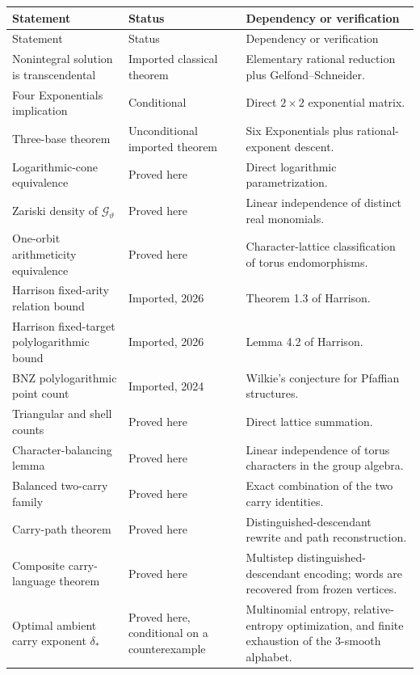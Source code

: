 \documentclass[11pt,oneside]{article}
\theoremstyle{definition}
\newcommand{\cG}{\mathscr{G}}
\begin{document}
\begin{longtable}{@{}>{\raggedright\arraybackslash}p{}>{\raggedright\arraybackslash}p{}>{\raggedright\arraybackslash}p{}@{}}
\toprule
Statement & Status & Dependency or verification \\
\midrule
\endfirsthead
\toprule
Statement & Status & Dependency or verification \\
\midrule
\endhead
Nonintegral solution is transcendental & Imported classical theorem & Elementary rational reduction plus Gelfond--Schneider. \\
Four Exponentials implication & Conditional & Direct $2\times2$ exponential matrix. \\
Three-base theorem & Unconditional imported theorem & Six Exponentials plus rational-exponent descent. \\
Logarithmic-cone equivalence & Proved here & Direct logarithmic parametrization. \\
Zariski density of $\cG_\vartheta$ & Proved here & Linear independence of distinct real monomials. \\
One-orbit arithmeticity equivalence & Proved here & Character-lattice classification of torus endomorphisms. \\
Harrison fixed-arity relation bound & Imported, 2026 & Theorem 1.3 of Harrison. \\
Harrison fixed-target polylogarithmic bound & Imported, 2026 & Lemma 4.2 of Harrison. \\
BNZ polylogarithmic point count & Imported, 2024 & Wilkie's conjecture for Pfaffian structures. \\
Triangular and shell counts & Proved here & Direct lattice summation. \\
Character-balancing lemma & Proved here & Linear independence of torus characters in the group algebra. \\
Balanced two-carry family & Proved here & Exact combination of the two carry identities. \\
Carry-path theorem & Proved here & Distinguished-descendant rewrite and path reconstruction. \\
Composite carry-language theorem & Proved here & Multistep distinguished-descendant encoding; words are recovered from frozen vertices. \\
Optimal ambient carry exponent $\delta_*$ & Proved here, conditional on a counterexample & Multinomial entropy, relative-entropy optimization, and finite exhaustion of the $3$-smooth alphabet. \\

\end{longtable}
\end{document}
